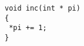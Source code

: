 \documentclass[10pt,a4paper]{article}
\begin{document}
\begin{verbatim}
void inc(int * pi)
{
 *pi += 1;
}
\end{verbatim}
\end{document}
